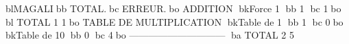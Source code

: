 blMAGALIbb           TOTAL.bc      ERREUR.bo
ADDITION
bkForce      1     bb  1	bc        1bo
bl TOTAL             1	        1bo
TABLE DE MULTIPLICATION
bkTable de   1     bb  1	bc        0bo
bkTable de  10     bb  0	bc        4bo
------------------------------
ba TOTAL             2	        5
